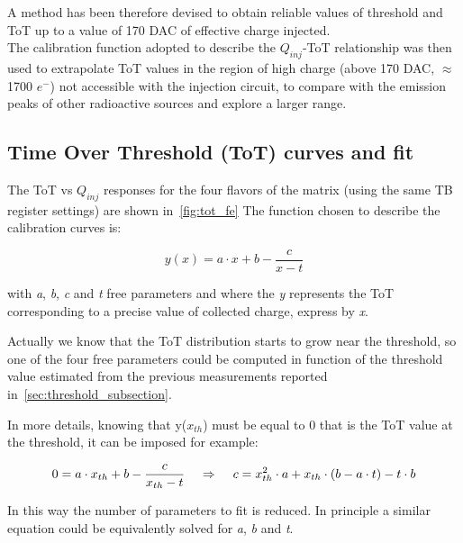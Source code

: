 A method has been therefore devised to obtain reliable values of threshold and ToT up to a value of 170 DAC of effective charge injected.\\

The calibration function adopted to describe the $Q_{inj}$-ToT relationship was then used to extrapolate ToT values in the region of high charge (above 170 DAC, $\approx$ 1700 $e^{-}$) not accessible with the injection circuit, to compare with the emission peaks of other radioactive sources and explore a larger range.


\subsection{Time Over Threshold (ToT) curves and fit} \label{sec:tot_fit}

The ToT vs $Q_{inj}$ responses for the four flavors of the matrix (using the same TB register settings) are shown in~\autoref{fig:tot_fe}
The function chosen to describe the calibration curves is:

\begin{equation}
y(x) = a\cdot x +b -\frac{c}{x-t}
\label{eq:fit_function}
\end{equation}

with \textit{a}, \textit{b}, \textit{c} and \textit{t} free parameters and where the \textit{y} represents the ToT corresponding to a precise value of collected charge, express by \textit{x}. 

Actually we know that the ToT distribution starts to grow near the threshold, so one of the four free parameters could be computed in function of the threshold value estimated from the previous measurements reported in~\autoref{sec:threshold_subsection}.

In more details, knowing that y($x_{th}$) must be equal to 0 that is the ToT value at the threshold, it can be imposed for example:

\begin{equation}
0 = a\cdot x_{th} + b - \frac{c}{x_{th}-t}  \hspace{.4cm}	\Rightarrow  \hspace{.4cm}	c = x_{th}^{2}\cdot a + x_{th}\cdot (b-a\cdot t) - t\cdot b
\end{equation}

In this way the number of parameters to fit is reduced. In principle a similar equation could be equivalently solved for \textit{a}, \textit{b} and \textit{t}. 


